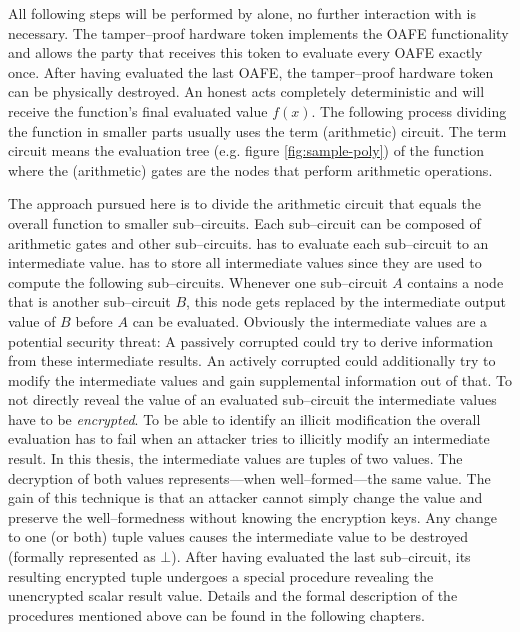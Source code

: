 All following steps will be performed by \JWpTwo{} alone, no further interaction
with \JWpOne{} is necessary. The tamper--proof hardware token implements the
OAFE functionality and allows the party that receives this token to evaluate
every OAFE exactly once. After having evaluated the last OAFE, the tamper--proof
hardware token can be physically destroyed. An honest \JWpTwo{} acts completely
deterministic and will receive the function's final evaluated value $f(x)$. The
following process dividing the function in smaller parts usually uses the term
(arithmetic) circuit. The term circuit means the evaluation tree (e.g. figure
\ref{fig:sample-poly}) of the function where the (arithmetic) gates are the
nodes that perform arithmetic operations.

The approach pursued here is to divide the arithmetic circuit that equals the
overall function to smaller sub--circuits. Each sub--circuit can be composed of
arithmetic gates and other sub--circuits. \JWpTwo{} has to evaluate each
sub--circuit to an intermediate value. \JWpTwo{} has to store all intermediate
values since they are used to compute the following sub--circuits.  Whenever one
sub--circuit $A$ contains a node that is another sub--circuit $B$, this node
gets replaced by the intermediate output value of $B$ before $A$ can be
evaluated. Obviously the intermediate values are a potential security threat: A
passively corrupted \JWpTwo{} could try to derive information from these
intermediate results. An actively corrupted \JWpTwo{} could additionally try to
modify the intermediate values and gain supplemental information out of that. To
not directly reveal the value of an evaluated sub--circuit the intermediate
values have to be \emph{encrypted}.  To be able to identify an illicit
modification the overall evaluation has to fail when an attacker tries to
illicitly modify an intermediate result. In this thesis, the intermediate values
are tuples of two values. The decryption of both values represents---when
well--formed---the same value. The gain of this technique is that an attacker
cannot simply change the value and preserve the well--formedness without knowing
the encryption keys. Any change to one (or both) tuple values causes the
intermediate value to be destroyed (formally represented as $\bot$). After
having evaluated the last sub--circuit, its resulting encrypted tuple undergoes
a special procedure revealing the unencrypted scalar result value. Details and
the formal description of the procedures mentioned above can be found in the
following chapters.

